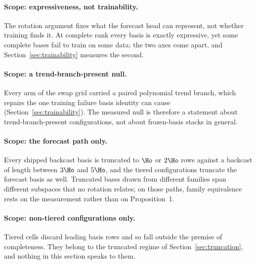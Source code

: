 \paragraph{Scope: expressiveness, not trainability.} The rotation argument fixes what the
forecast head can represent, not whether training finds it. At complete rank every basis is
exactly expressive, yet some complete bases fail to train on some data; the two axes come apart,
and Section~\ref{sec:trainability} measures the second.

\paragraph{Scope: a trend-branch-present null.} Every arm of the swap grid carried a paired
polynomial trend branch, which repairs the one training failure basis identity can cause
(Section~\ref{sec:trainability}). The measured null is therefore a statement about
trend-branch-present configurations, not about frozen-basis stacks in general.

\paragraph{Scope: the forecast path only.} Every shipped backcast basis is truncated to $\Ho$ or
$2\Ho$ rows against a backcast of length between $3\Ho$ and $5\Ho$, and the tiered configurations
truncate the forecast basis as well. Truncated bases drawn from different families span different
subspaces that no rotation relates; on those paths, family equivalence rests on the measurement
rather than on Proposition~1.

\paragraph{Scope: non-tiered configurations only.} Tiered cells discard leading basis rows and so
fall outside the premise of completeness. They belong to the truncated regime of
Section~\ref{sec:truncation}, and nothing in this section speaks to them.
